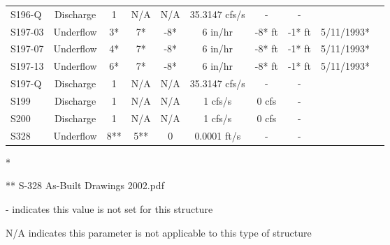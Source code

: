 \begin{table}[h]
\begin{tabular}{@{}lccccccccc@{}}
{S196-Q}        & Discharge     & 1        & N/A         & N/A          & 35.3147 cfs/s  & -               & -       &                 \\
{S197-03}       & Underflow     & 3*       & 7*          & -8*          & 6 in/hr        & -8* ft          & -1* ft  & 5/11/1993*      \\
{S197-07}       & Underflow     & 4*       & 7*          & -8*          & 6 in/hr        & -8* ft          & -1* ft  & 5/11/1993*      \\
{S197-13}       & Underflow     & 6*       & 7*          & -8*          & 6 in/hr        & -8* ft          & -1* ft  & 5/11/1993*      \\
{S197-Q}        & Discharge     & 1        & N/A         & N/A          & 35.3147 cfs/s  & -               & -       &                 \\
{S199}          & Discharge     & 1        & N/A         & N/A          & 1 cfs/s        & 0 cfs           & -       &                 \\
{S200}          & Discharge     & 1        & N/A         & N/A          & 1 cfs/s        & 0 cfs           & -       &                 \\
{S328}          & Underflow     & 8**      & 5**         & 0            & 0.0001 ft/s    & -               & -       &                 \\
\hline
\end{tabular}

* \cite{corp2005}

** S-328 As-Built Drawings 2002.pdf

- indicates this value is not set for this structure

N/A indicates this parameter is not applicable to this type of structure
\end{table}
\normalsize

